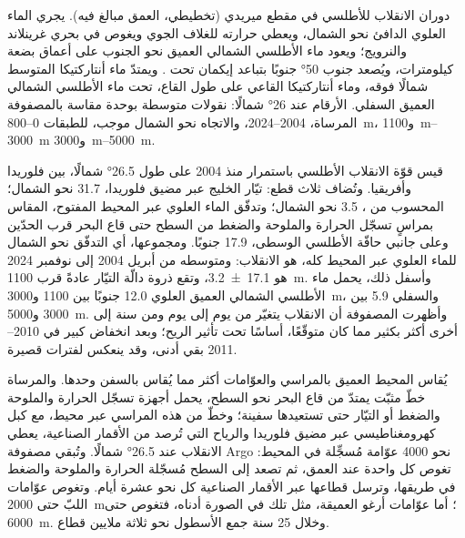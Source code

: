 \begin{omfigure}
{\small دوران الانقلاب للأطلسي في مقطع ميريدي (تخطيطي، العمق مبالغ فيه). يجري الماء العلوي الدافئ نحو الشمال، ويعطي حرارته للغلاف الجوي ويغوص في بحري غرينلاند والنرويج؛ ويعود ماء الأطلسي الشمالي العميق نحو الجنوب على أعماق بضعة كيلومترات، ويُصعد جنوب \ang{50} جنوبًا بتباعد إيكمان تحت . ويمتدّ ماء أنتاركتيكا المتوسط شمالًا فوقه، وماء أنتاركتيكا القاعي على طول القاع، تحت ماء الأطلسي الشمالي العميق السفلي. الأرقام عند \ang{26} شمالًا: نقولات متوسطة بوحدة  مقاسة بالمصفوفة المرساة، 2004--2024، والاتجاه نحو الشمال موجب، للطبقات 0--\qty{800}{m}، و\qtyrange{1100}{3000}{m} و\qtyrange{3000}{5000}{m}.}
\label{fig:b1:ocean-circulation:moc}
\end{omfigure}

قيس قوّة الانقلاب الأطلسي باستمرار منذ 2004 على طول \ang{26.5} شمالًا، بين فلوريدا وأفريقيا. وتُضاف ثلاث قطع: تيّار الخليج عبر مضيق فلوريدا، \qty{31.7}{\sverdrup} نحو الشمال؛  المحسوب من ، \qty{3.5}{\sverdrup} نحو الشمال؛ وتدفّق الماء العلوي عبر المحيط المفتوح، المقاس بمراسٍ تسجّل الحرارة والملوحة والضغط من السطح حتى قاع البحر قرب الحدّين وعلى جانبي حافّة الأطلسي الوسطى، \qty{17.9}{\sverdrup} جنوبًا. ومجموعها، أي التدفّق نحو الشمال للماء العلوي عبر المحيط كله، هو الانقلاب: ومتوسطه من أبريل 2004 إلى نوفمبر 2024 هو \qty[uncertainty-mode=separate]{17.1 \pm 3.2}{\sverdrup}، وتقع ذروة دالّة التيّار عادةً قرب \qty{1100}{m}. وأسفل ذلك، يحمل ماء الأطلسي الشمالي العميق العلوي \qty{12.0}{\sverdrup} جنوبًا بين 1100 و\qty{3000}{m}، والسفلي \qty{5.9}{\sverdrup} بين 3000 و\qty{5000}{m}. وأظهرت المصفوفة أن الانقلاب يتغيّر من يوم إلى يوم ومن سنة إلى أخرى أكثر بكثير مما كان متوقّعًا، أساسًا تحت تأثير الريح؛ وبعد انخفاض كبير في 2010--2011 بقي أدنى، وقد ينعكس لفترات قصيرة.

\begin{inthelab}
يُقاس المحيط العميق بالمراسي والعوّامات أكثر مما يُقاس بالسفن وحدها. والمرساة خطّ مثبّت يمتدّ من قاع البحر نحو السطح، يحمل أجهزة تسجّل الحرارة والملوحة والضغط أو التيّار حتى تستعيدها سفينة؛ وخطّ من هذه المراسي عبر محيط، مع كبل كهرومغناطيسي عبر مضيق فلوريدا والرياح التي تُرصد من الأقمار الصناعية، يعطي الانقلاب عند \ang{26.5} شمالًا. وتُبقي مصفوفة Argo نحو \num{4000} عوّامة مُسجِّلة في المحيط: تغوص كل واحدة عند العمق، ثم تصعد إلى السطح مُسجّلة الحرارة والملوحة والضغط في طريقها، وترسل قطاعها عبر الأقمار الصناعية كل نحو عشرة أيام. وتغوص عوّامات اللبّ حتى \qty{2000}{m}؛ أما عوّامات أرغو العميقة، مثل تلك في الصورة أدناه، فتغوص حتى \qty{6000}{m}. وخلال 25 سنة جمع الأسطول نحو ثلاثة ملايين قطاع.
\end{inthelab}

